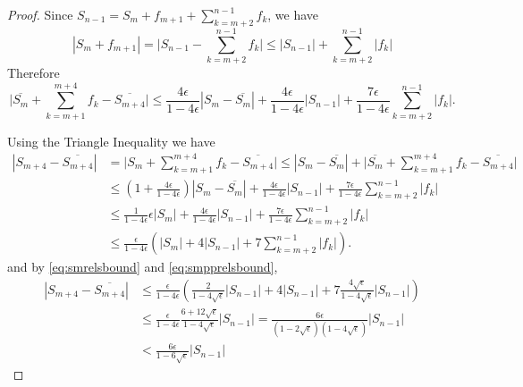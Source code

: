 \documentclass[12pt]{article}
\theoremstyle{definition}
\numberwithin{equation}{section}
\numberwithin{figure}{section}
\begin{document}
\begin{proof}
    Since $S_{n-1} = S_m + f_{m+1} + \sum_{k=m+2}^{n-1} f_k$, we have
    \begin{equation*}
        |S_m + f_{m+1}|
        = \bigl|S_{n-1} - \sum_{k=m+2}^{n-1}f_k\bigr|
        \leq |S_{n-1}| + \sum_{k=m+2}^{n-1} |f_k|
    \end{equation*}
    Therefore
    \begin{equation*}
        \bigl|\overline{S_m} + \sum_{k=m+1}^{m+4}f_k - \overline{S_{m+4}}\bigr|
        \leq \frac{4\epsilon}{1-4\epsilon} \left|S_m - \overline{S_m}\right|
        + \frac{4\epsilon}{1-4\epsilon} |S_{n-1}|
        + \frac{7\epsilon}{1-4\epsilon} \sum_{k=m+2}^{n-1}|f_k|.
    \end{equation*}

    Using the Triangle Inequality we have
    \begin{align*}
    \left|S_{m+4} - \overline{S_{m+4}}\right|
        & = \bigl|S_m + \sum_{k=m+1}^{m+4}f_k - \overline{S_{m+4}}\bigr|
        \leq |S_m - \overline{S_m} | + \bigl|\overline{S_m} + \sum_{k=m+1}^{m+4}f_k - \overline{S_{m+4}} \bigr| \\
        & \leq \left(1 + \frac{4\epsilon}{1-4\epsilon}\right) \left|S_m - \overline{S_m}\right| + \frac{4\epsilon}{1-4\epsilon} |S_{n-1}|
                + \frac{7\epsilon}{1-4\epsilon} \sum_{k=m+2}^{n-1}|f_k| \\
        & \leq \frac{1}{1-4\epsilon} \epsilon |S_m| + \frac{4\epsilon}{1-4\epsilon} |S_{n-1}|
                + \frac{7\epsilon}{1-4\epsilon} \sum_{k=m+2}^{n-1}|f_k| \\
        & \leq \frac{\epsilon}{1-4\epsilon} \left(|S_m| + 4 |S_{n-1}|
                + 7 \sum_{k=m+2}^{n-1}|f_k|\right).
    \end{align*}
    and by \eqref{eq:smrelsbound} and \eqref{eq:smpprelsbound},
    \begin{align}
    \left|S_{m+4} - \overline{S_{m+4}}\right|
        & \leq \frac{\epsilon}{1-4\epsilon} 
            \left(
                \frac{2}{1-4\sqrt{\epsilon}} |S_{n-1}|
                + 4 |S_{n-1}|
                + 7 \frac{4\sqrt{\epsilon}}{1-4\sqrt{\epsilon}} |S_{n-1}|
            \right) \nonumber \\
        & \leq \frac{\epsilon}{1-4\epsilon} \frac{6+12\sqrt{\epsilon}}{1-4\sqrt{\epsilon}} |S_{n-1}| 
            = \frac{6\epsilon }{(1-2\sqrt{\epsilon})(1-4\sqrt{\epsilon})} |S_{n-1}| \nonumber \\
        & < \frac{6\epsilon}{1-6\sqrt{\epsilon}} |S_{n-1}| 
        \label{eq:smfiveerror}
    \end{align}


\end{proof}
\end{document}
